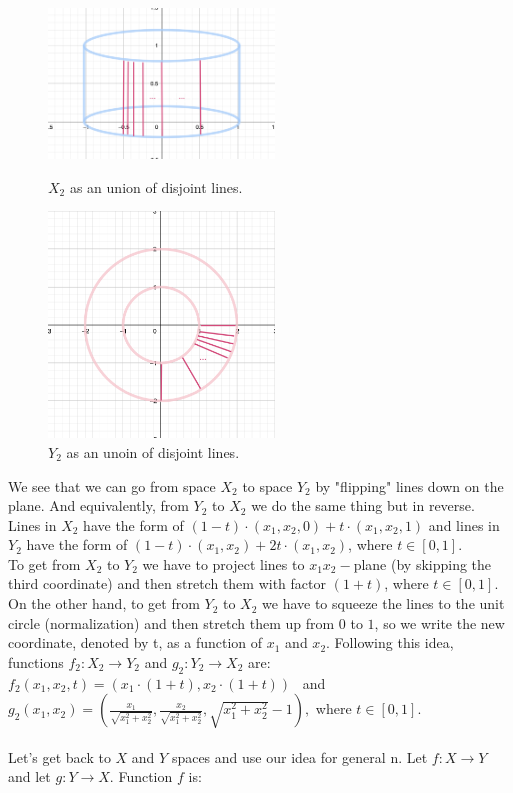\documentclass[a4paper,11pt]{article}
\begin{document}
\begin{figure}[ht!]
    \begin{minipage}{0.45\textwidth}
        \centering
        \includegraphics[width=60mm]{X_n2_lines.png}
        \caption{$X_2$ as an union of disjoint lines.}
      \end{minipage}\hfill
    \begin{minipage}{0.55\textwidth}
        \centering
        \includegraphics[width=60mm]{Y_n2_lines.png}
        \caption{$Y_2$ as an unoin of disjoint lines.}
      \end{minipage}\hfill
   \end{figure}

\noindent
We see that we can go from space $X_2$ to space $Y_2$ by "flipping" lines down on the plane. And equivalently, from $Y_2$ to $X_2$ we do the same thing but in reverse.
\\
Lines in $X_2$ have the form of $(1 - t) \cdot (x_1, x_2, 0) + t \cdot (x_1, x_2, 1)$ and lines in $Y_2$ have the form of $(1 - t) \cdot (x_1, x_2) + 2  t \cdot (x_1, x_2)$, where $ t \in [0, 1]$.
\\
To get from $X_2$ to $Y_2$ we have to project lines to $x_1 x_2-$plane (by skipping the third coordinate) and then stretch them with factor  $(1 + t)$, where $t \in [0,1]$.
On the other hand, to get from $Y_2$ to $X_2$ we have to squeeze the lines to the unit circle (normalization) and then stretch them up from $0$ to $1$, so we write the new coordinate, denoted by t, as a function of $x_1$ and $x_2$.
Following this idea, functions $f_2: X_2 \to Y_2$ and $g_2: Y_2 \to X_2$ are: \\
$f_2(x_1, x_2, t) = (x_1 \cdot (1 + t), x_2 \cdot (1 + t))$ \ and \
$g_2(x_1, x_2) = \left( \frac{x_1}{\sqrt{x_1^2 + x_2^2}}, \frac{x_2}{\sqrt{x_1^2 + x_2^2}}, \sqrt{x_1^2 + x_2^2} - 1 \right),$  where $t \in [0,1]$.
\\
\\
Let's get back to $X$ and $Y$ spaces and use our idea for general n.
Let $f: X \to Y$ and let $g: Y \to X$. Function $f$ is:
\end{document}

